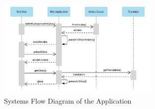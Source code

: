 \begin{figure}
	\caption{Systems Flow Diagram of the Application}
	\label{fig:sf}
	\begin{center}
	\includegraphics[width=0.7\textwidth]{Graphics/SystemsFlowNew}
\end{center}
\end{figure}